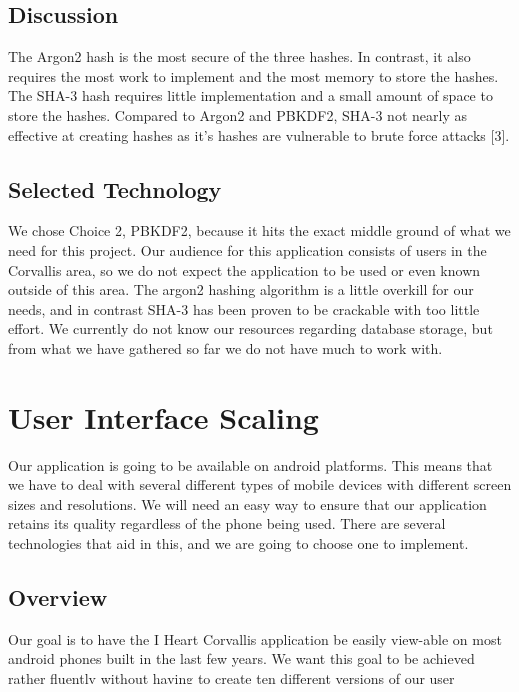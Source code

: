 \documentclass{scrreprt}
\begin{document}
\section{Discussion}
The Argon2 hash is the most secure of the three hashes. In contrast, it also requires the most work to implement and the most memory to store the hashes. The SHA-3 hash requires little implementation and a small amount of space to store the hashes. Compared to Argon2 and PBKDF2, SHA-3 not nearly as effective at creating hashes as it's hashes are vulnerable to brute force attacks [3].

\section{Selected Technology}
We chose Choice 2, PBKDF2, because it hits the exact middle ground of what we need for this project. Our audience for this application consists of users in the Corvallis area, so we do not expect the application to be used or even known outside of this area. The argon2 hashing algorithm is a little overkill for our needs, and in contrast SHA-3 has been proven to be crackable with too little effort. We currently do not know our resources regarding database storage, but from what we have gathered so far we do not have much to work with.

\chapter{User Interface Scaling} %
Our application is going to be available on android platforms. This means that we have to deal with several different types of mobile devices with different screen sizes and resolutions. We will need an easy way to ensure that our application retains its quality regardless of the phone being used. There are several technologies that aid in this, and we are going to choose one to implement.
\section{Overview}
Our goal is to have the I Heart Corvallis application be easily view-able on most android phones built in the last few years. We want this goal to be achieved rather fluently without having to create ten different versions of our user interface.
\section{Criteria}
Our criteria for this piece is its ease of implementation, it's effectiveness, and how well it meshes with our other user interface technologies.
\end{document}
